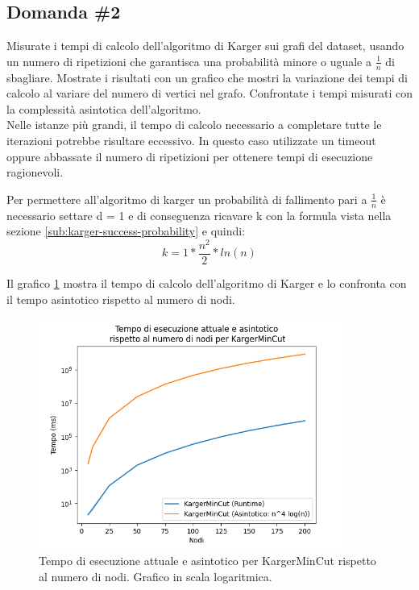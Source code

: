 \subsection{Domanda \#2}
\label{sec:question-2}

\begin{displayquote}
Misurate i tempi di calcolo dell'algoritmo di Karger sui grafi del
dataset, usando un numero di ripetizioni che garantisca una
probabilità minore o uguale a $\frac{1}{n}$ di sbagliare. Mostrate i
risultati con un grafico che mostri la variazione dei tempi di calcolo
al variare del numero di vertici nel grafo. Confrontate i tempi
misurati con la complessità asintotica dell'algoritmo. \\

\noindent Nelle istanze più grandi, il tempo di calcolo necessario a
completare tutte le iterazioni potrebbe risultare eccessivo. In questo
caso utilizzate un timeout oppure abbassate il numero di ripetizioni
per ottenere tempi di esecuzione ragionevoli.
\end{displayquote}

\noindent Per permettere all'algoritmo di karger un probabilità di
fallimento pari a $\frac{1}{n}$ è necessario settare d = 1 e di
conseguenza ricavare k con la formula vista nella sezione
\ref{sub:karger-success-probability} e quindi:
$$ k = 1 * \frac{n^2}{2} * ln(n)$$

\noindent Il grafico \ref{fig:karger-runtime-chart} mostra il tempo di
calcolo dell'algoritmo di Karger e lo confronta con il tempo
asintotico rispetto al numero di nodi.

\begin{figure}[H]
    \centering

    \includegraphics[width=0.9\textwidth]{./images/Tempo_di_esecuzione_attuale_e_asintotico__rispetto_al_numero_di_nodi_per_KargerMinCut.png}

    \caption{Tempo di esecuzione attuale e asintotico per KargerMinCut rispetto al numero di nodi. Grafico in scala logaritmica.}
    \label{fig:karger-runtime-chart}
\end{figure}

